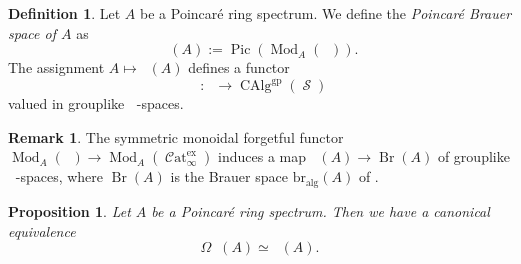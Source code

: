 \documentclass{article}
\DeclareMathOperator{\Br}{Br} %
\DeclareMathOperator{\Brp}{Br^p} %
\DeclareMathOperator{\CAlg}{CAlg} %
\DeclareMathOperator{\CAlgp}{CAlg^p} %
\DeclareMathOperator{\Cat}{\mathcal{C}at} %
\DeclareMathOperator{\Catpidem}{Cat^p_{\infty, idem}} %
\DeclareMathOperator{\Einfty}{\mathbf{E}_\infty} %
\DeclareMathOperator{\gp}{gp} %
\DeclareMathOperator{\Mod}{Mod} %
\DeclareMathOperator{\Pic}{Pic} %
\DeclareMathOperator{\Picp}{Pic^p} %
\DeclareMathOperator{\Spaces}{\mathcal{S}} %
\newtheorem{proposition}[equation]{Proposition}
\theoremstyle{definition}
\newtheorem{definition}[equation]{Definition}
\newtheorem{remark}[equation]{Remark}
\begin{document}
\begin{definition}
    \label{definition:poincare_brauer_space}
    Let $A$ be a Poincaré ring spectrum. We define the \emph{Poincaré Brauer space of $A$} as $$\Brp(A):=\Pic(\Mod_A(\Catpidem)).$$
    The assignment $ A \mapsto \Brp(A) $ defines a functor
    \begin{equation*}
        \Brp \colon \CAlgp \to \CAlg^{\gp}(\Spaces)
    \end{equation*}
    valued in grouplike $ \Einfty $-spaces. 
\end{definition}

\begin{remark}
    The symmetric monoidal forgetful functor $ \Mod_A(\Catpidem) \to \Mod_A(\Cat^{\mathrm{ex}}_\infty) $ induces a map $ \Brp(A) \to \Br(A) $ of grouplike $ \Einfty $-spaces, where $ \Br(A) $ is the Brauer space $ \mathrm{br}_{\mathrm{alg}}(A) $ of \cite[1154-1155]{MR3190610}. 
\end{remark}
\begin{proposition}
    Let $A$ be a Poincaré ring spectrum. Then we have a canonical equivalence $$\Omega \Brp(A) \simeq \Picp(A).$$
\end{proposition}
\end{document}
